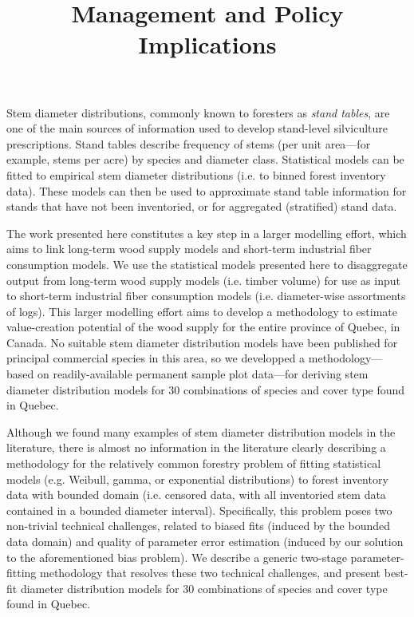 \documentclass{article}
\title{Management and Policy Implications}
\author{}
\date{}
\begin{document}
\maketitle
\thispagestyle{empty}


Stem diameter distributions, commonly known to foresters as \emph{stand tables}, are one of the main sources of information used to develop stand-level silviculture prescriptions. Stand tables describe frequency of stems (per unit area---for example, stems per acre) by species and diameter class. Statistical models can be fitted to empirical stem diameter distributions (i.e. to binned forest inventory data). These models can then be used to approximate stand table information for stands that have not been inventoried, or for aggregated (stratified) stand data. 

The work presented here constitutes a key step in a larger modelling effort, which aims to link long-term wood supply models and short-term industrial fiber consumption models. We use the statistical models presented here to disaggregate output from long-term wood supply models (i.e. timber volume) for use as input to short-term industrial fiber consumption models (i.e. diameter-wise assortments of logs). This larger modelling effort aims to develop a methodology to estimate value-creation potential of the wood supply for the entire province of Quebec, in Canada. No suitable stem diameter distribution models have been published for principal commercial species in this area, so we developped a methodology---based on readily-available permanent sample plot data---for deriving stem diameter distribution models for 30 combinations of species and cover type found in Quebec. 

Although we found many examples of stem diameter distribution models in the literature, there is almost no information in the literature clearly describing a methodology for the relatively common forestry problem of fitting statistical models (e.g. Weibull, gamma, or exponential distributions) to forest inventory data with bounded domain (i.e. censored data, with all inventoried stem data contained in a bounded diameter interval). Specifically, this problem poses two non-trivial technical challenges, related to biased fits (induced by the bounded data domain) and quality of parameter error estimation (induced by our solution to the aforementioned bias problem). We describe a generic two-stage parameter-fitting methodology that resolves these two technical challenges, and present best-fit diameter distribution models for 30 combinations of species and cover type found in Quebec.  
\end{document}
